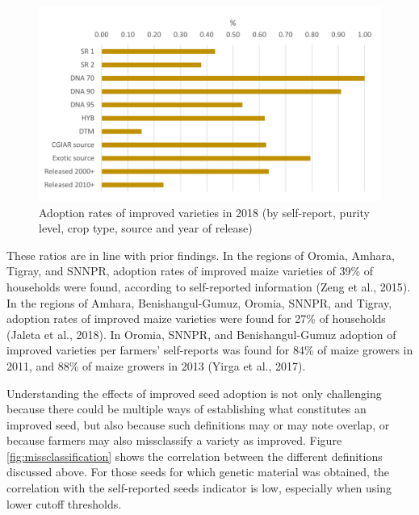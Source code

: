 \documentclass{article}
\begin{document}
\begin{figure}
    \centering
    \includegraphics{results/figures/adoption_r4.png}
    \caption{Adoption rates of improved varieties in 2018 (by self-report, purity level, crop type, source and year of release)}
    \label{fig:adoption_r4}
\end{figure}

These ratios are in line with prior findings. In the regions of Oromia, Amhara, Tigray, and SNNPR, adoption rates of improved maize varieties of 39\% of households were found, according to self-reported information (Zeng et al., 2015). In the regions of Amhara, Benishangul-Gumuz, Oromia, SNNPR, and Tigray, adoption rates of improved maize varieties were found for 27\% of households (Jaleta et al., 2018). In Oromia, SNNPR, and Benishangul-Gumuz adoption of improved varieties per farmers’ self-reports was found for 84\% of maize growers in 2011, and 88\% of maize growers in 2013 (Yirga et al., 2017).

Understanding the effects of improved seed adoption is not only challenging because there could be multiple ways of establishing what constitutes an improved seed, but also because such definitions may or may note overlap, or because farmers may also missclassify a variety as improved. Figure \ref{fig:missclassification} shows the correlation between the different definitions discussed above. For those seeds for which genetic material was obtained, the correlation with the self-reported seeds indicator is low, especially when using lower cutoff thresholds. 
\end{document}
